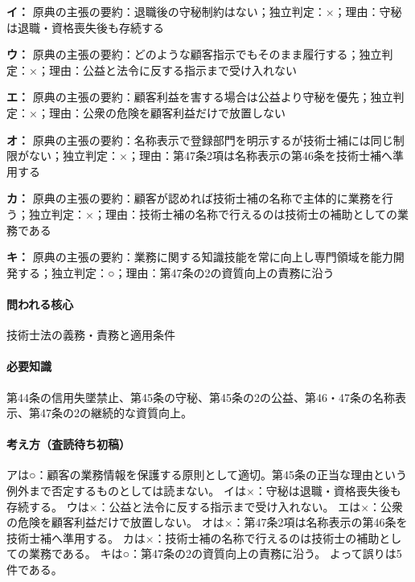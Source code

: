 \noindent\textbf{イ：} 原典の主張の要約：退職後の守秘制約はない；独立判定：×；理由：守秘は退職・資格喪失後も存続する\par

\noindent\textbf{ウ：} 原典の主張の要約：どのような顧客指示でもそのまま履行する；独立判定：×；理由：公益と法令に反する指示まで受け入れない\par

\noindent\textbf{エ：} 原典の主張の要約：顧客利益を害する場合は公益より守秘を優先；独立判定：×；理由：公衆の危険を顧客利益だけで放置しない\par

\noindent\textbf{オ：} 原典の主張の要約：名称表示で登録部門を明示するが技術士補には同じ制限がない；独立判定：×；理由：第47条2項は名称表示の第46条を技術士補へ準用する\par

\noindent\textbf{カ：} 原典の主張の要約：顧客が認めれば技術士補の名称で主体的に業務を行う；独立判定：×；理由：技術士補の名称で行えるのは技術士の補助としての業務である\par

\noindent\textbf{キ：} 原典の主張の要約：業務に関する知識技能を常に向上し専門領域を能力開発する；独立判定：○；理由：第47条の2の資質向上の責務に沿う\par

\paragraph{問われる核心} 技術士法の義務・責務と適用条件

\paragraph{必要知識} 第44条の信用失墜禁止、第45条の守秘、第45条の2の公益、第46・47条の名称表示、第47条の2の継続的な資質向上。

\paragraph{考え方（査読待ち初稿）} アは○：顧客の業務情報を保護する原則として適切。第45条の正当な理由という例外まで否定するものとしては読まない。 イは×：守秘は退職・資格喪失後も存続する。 ウは×：公益と法令に反する指示まで受け入れない。 エは×：公衆の危険を顧客利益だけで放置しない。 オは×：第47条2項は名称表示の第46条を技術士補へ準用する。 カは×：技術士補の名称で行えるのは技術士の補助としての業務である。 キは○：第47条の2の資質向上の責務に沿う。 よって誤りは5件である。

